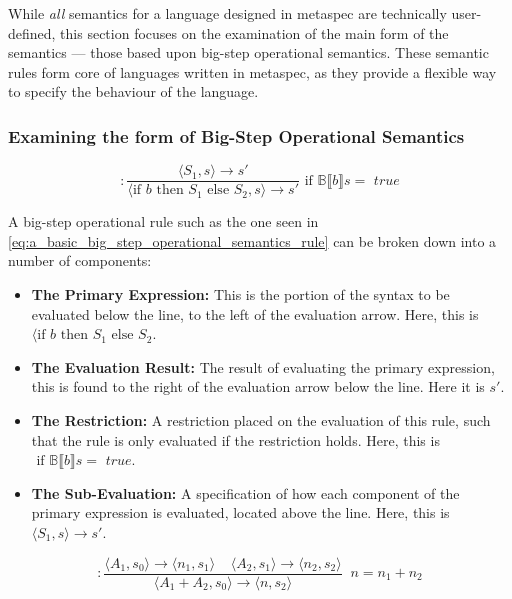 While \textit{all} semantics for a language designed in \gls{metaspec} are technically user-defined, this section focuses on the examination of the main form of the semantics --- those based upon big-step operational semantics. 
These semantic rules form core of languages written in \gls{metaspec}, as they provide a flexible way to specify the behaviour of the language. 

\subsubsection{Examining the form of Big-Step Operational Semantics} %
\label{ssub:examining_the_form_of_big_step_operational_semantics}
\begin{equation}
    [\text{if}] : \frac{\langle S_1, s \rangle \to s'}{\langle \text{if } b \text{ then } S_1 \text{ else } S_2, s\rangle \to s'} \text{ if } \mathbb{B}\llbracket b \rrbracket s = \textit{ true} 
    \label{eq:a_basic_big_step_operational_semantics_rule}
\end{equation}

A big-step operational rule such as the one seen in \autoref{eq:a_basic_big_step_operational_semantics_rule} can be broken down into a number of components:
\begin{itemize}
    \item \textbf{The Primary Expression:} This is the portion of the syntax to be evaluated below the line, to the left of the evaluation arrow.
    Here, this is $\langle \text{if } b \text{ then } S_1 \text{ else } S_2$.
    \item \textbf{The Evaluation Result:} The result of evaluating the primary expression, this is found to the right of the evaluation arrow below the line.
    Here it is $s'$. 
    \item \textbf{The Restriction:} A restriction placed on the evaluation of this rule, such that the rule is only evaluated if the restriction holds. 
    Here, this is $\text{ if } \mathbb{B}\llbracket b \rrbracket s = \textit{ true}$.
    \item \textbf{The Sub-Evaluation:} A specification of how each component of the primary expression is evaluated, located above the line.
    Here, this is $\langle S_1, s \rangle \to s'$. 
\end{itemize}

\begin{equation}
    [+] : \frac{\langle A_1, s_0\rangle \to \langle n_1, s_1\rangle \;\;\;\; \langle A_2, s_1 \rangle \to \langle n_2, s_2\rangle}{\langle A_1 + A_2, s_0 \rangle \to \langle n, s_2 \rangle}\;\; n = n_1 + n_2
    \label{eq:an_alternate_big_step_operational_semantics_rule}
\end{equation}

